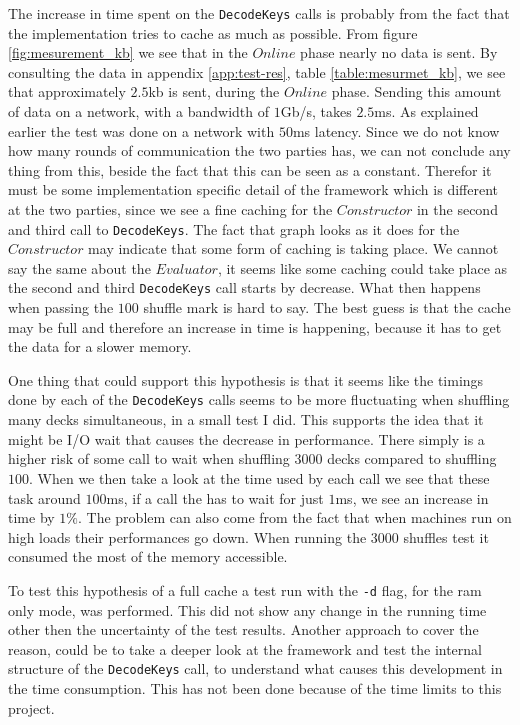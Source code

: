 \documentclass[twoside,11pt,openright]{report}
\begin{document}
The increase in time spent on the \verb|DecodeKeys| calls is probably from the fact that the implementation tries to cache as much as possible. From figure \ref{fig:mesurement_kb} we see that in the $Online$ phase nearly no data is sent. By consulting the data in appendix \ref{app:test-res}, table \ref{table:mesurmet_kb}, we see that approximately $2.5$kb is sent, during the $Online$ phase. Sending this amount of data on a network, with a bandwidth of $1$Gb/s, takes $2.5$ms. As explained earlier the test was done on a network with $50$ms latency. Since we do not know how many rounds of communication the two parties has, we can not conclude any thing from this, beside the fact that this can be seen as a constant. Therefor it must be some implementation specific detail of the framework which is different at the two parties, since we see a fine caching for the $Constructor$ in the second and third call to \verb|DecodeKeys|. The fact that graph looks as it does for the $Constructor$ may indicate that some form of caching is taking place. We cannot say the same about the $Evaluator$, it seems like some caching could take place as the second and third \verb|DecodeKeys| call starts by decrease. What then happens when passing the $100$ shuffle mark is hard to say. The best guess is that the cache may be full and therefore an increase in time is happening, because it has to get the data for a slower memory.

One thing that could support this hypothesis is that it seems like the timings done by each of the \verb|DecodeKeys| calls seems to be more fluctuating when shuffling many decks simultaneous, in a small test I did. This supports the idea that it might be I/O wait that causes the decrease in performance. There simply is a higher risk of some call to wait when shuffling $3000$ decks compared to shuffling $100$. When we then take a look at the time used by each call we see that these task around $100$ms, if a call the has to wait for just $1$ms, we see an increase in time by $1\%$. The problem can also come from the fact that when machines run on high loads their performances go down. When running the $3000$ shuffles test it consumed the most of the memory accessible.

To test this hypothesis of a full cache a test run with the \verb|-d| flag, for the ram only mode, was performed. This did not show any change in the running time other then the uncertainty of the test results. Another approach to cover the reason, could be to take a deeper look at the framework and test the internal structure of the \verb|DecodeKeys| call, to understand what causes this development in the time consumption. This has not been done because of the time limits to this project.
\end{document}
